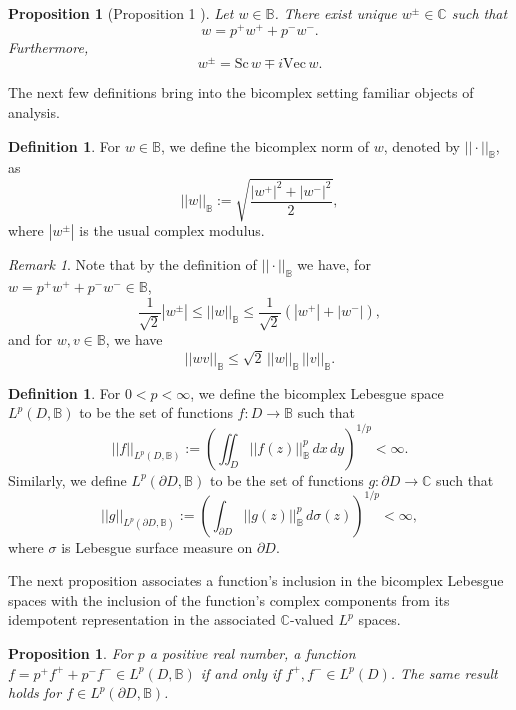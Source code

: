 \documentclass[suppldata]{interact}
\theoremstyle{plain}%
\newtheorem{prop}[theorem]{Proposition}
\theoremstyle{definition}
\newtheorem{deff}[theorem]{Definition}
\theoremstyle{remark}
\newtheorem{comm}{Remark}
\newcommand{\C}{\mathbb C}
\newcommand{\p}{\partial}
\newcommand{\bc}{\mathbb{B}}
\newcommand{\sca}{\text{Sc}\,}
\newcommand{\vect}{\text{Vec}\,}
\begin{document}
\begin{prop}[Proposition 1 \cite{BCTransmutation}]\label{everybchasplusandminus}
    Let $w \in \bc$. There exist unique $w^{\pm} \in \C$ such that 
    \[
        w = p^+ w^+ + p^- w^-.
    \]
    Furthermore, 
    \[
    w^{\pm} = \sca w \mp i \vect w.
    \]
\end{prop}

The next few definitions bring into the bicomplex setting familiar objects of analysis.

\begin{deff}
    For $w \in \bc$, we define the bicomplex norm of $w$, denoted by $||\cdot||_{\bc}$,  as
    \[
        ||w||_{\bc} := \sqrt{\frac{|w^+|^2 + |w^-|^2}{2}},
    \]
    where $|w^{\pm}|$ is the usual complex modulus. 
\end{deff}

\begin{comm}\label{basicestimate}
    Note that by the definition of $||\cdot||_{\bc}$ we have, for $w = p^+ w^+ + p^- w^- \in \bc$, 
    \[
        \frac{1}{\sqrt{2}} |w^\pm| \leq ||w||_{\bc} \leq \frac{1}{\sqrt{2}}\left( |w^+| + |w^-|\right), 
    \]
    and for $w,v \in \bc$, we have
    \[
        ||wv||_\bc \leq \sqrt{2} \, ||w||_\bc \, ||v||_\bc.
    \]
\end{comm}

\begin{deff}
    For $0 < p < \infty$, we define the bicomplex Lebesgue space $L^p(D, \bc)$ to be the set of functions $f: D \to \bc$ such that 
    \[  
        ||f||_{L^p(D,\bc)}:= \left( \iint_D ||f(z)||^p_{\bc} \,dx\,dy \right)^{1/p} < \infty.
    \]
    Similarly, we define $L^p(\p D, \bc)$ to be the set of functions $g: \p D \to \C$ such that 
    \[
        ||g||_{L^p(\p D,\bc)}:= \left( \int_{\p D} ||g(z)||^p_{\bc} \,d\sigma(z) \right)^{1/p} < \infty,
    \]
    where $\sigma$ is Lebesgue surface measure on $\p D$. 
\end{deff}

The next proposition associates a function's inclusion in the bicomplex Lebesgue spaces with the inclusion of the function's complex components from its idempotent representation in the associated $\mathbb{C}$-valued $L^p$ spaces. 

\begin{prop}\label{propLqiff}
    For $p$ a positive real number, a function $f = p^+ f^+ + p^- f^- \in L^p(D, \bc)$ if and only if $f^+, f^- \in L^p(D)$. The same result holds for $f \in L^p(\p D, \bc)$.
\end{prop}
\end{document}
